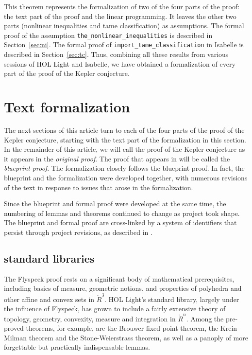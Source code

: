 This theorem represents the formalization of two of the four parts of
the proof: the text part of the proof and the linear programming.  It
leaves the other two parts (nonlinear inequalities and tame
classification) as assumptions.  The formal proof of the assumption
\verb!the_nonlinear_inequalities! is described in
Section~\ref{sec:ni}.  The formal proof of
\verb!import_tame_classification! in Isabelle is described in
Section~\ref{sec:tc}.  Thus, combining all these results from various
sessions of HOL Light and Isabelle, we have obtained a formalization
of every part of the proof of the Kepler conjecture.





\section{Text formalization}\label{sec:tf}


The next sections of this article turn to each of the four parts of
the proof of the Kepler conjecture, starting with the text part of the
formalization in this section.  In the remainder of this article, we
will call the proof of the Kepler conjecture as it appears in
\cite{Hales:2006:DCG} the {\it original proof}.
The proof that appears in \cite{DSP} will be called the {\it blueprint
  proof}.  The formalization closely follows the blueprint proof.  In
fact, the blueprint and the formalization were developed together, with
numerous revisions of the text in response to issues that arose in the
formalization.

Since the blueprint and formal proof were developed at the same time,
the numbering of lemmas and theorems continued to change as project
took shape.  The blueprint and formal proof are cross-linked by a
system of identifiers that persist through project revisions, as
described in \cite[]{FlyspeckWiki}.

\subsection{standard libraries}

The Flyspeck proof rests on a significant body of mathematical
prerequisites, including basics of measure, geometric notions, and
properties of polyhedra and other affine and convex sets in
$\ring{R}^3$. HOL Light's standard library, largely under the
influence of Flyspeck, has grown to include a fairly extensive theory
of topology, geometry, convexity, measure and integration in
$\ring{R}^n$. Among the pre-proved theorems, for example, are the
Brouwer fixed-point theorem, the Krein-Milman theorem and the
Stone-Weierstrass theorem, as well as a panoply of more forgettable
but practically indispensable lemmas.

